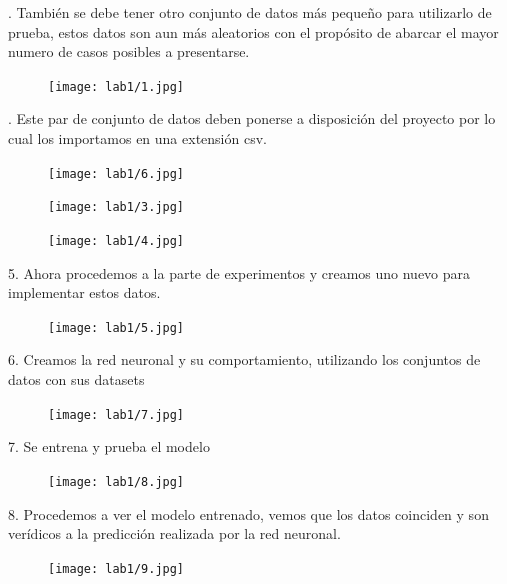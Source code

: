 \documentclass[11pt]{article}
\begin{document}
. También se debe tener otro conjunto de datos más pequeño para utilizarlo de prueba, estos datos son aun más aleatorios con el propósito de abarcar el mayor numero de casos posibles a presentarse.\\ 

\begin{figure}[htp]
\centering
\texttt{[image: lab1/1.jpg]}
\label{fig:lion}
\end{figure}

. Este par de conjunto de datos deben ponerse a disposición del proyecto por lo cual los importamos en una extensión csv.\\
\begin{figure}[htp]
\centering
\texttt{[image: lab1/6.jpg]}
\label{fig:lion}
\end{figure}

\begin{figure}[htp]
\centering
\texttt{[image: lab1/3.jpg]}
\label{fig:lion}
\end{figure}

\begin{figure}[htp]
\centering
\texttt{[image: lab1/4.jpg]}
\label{fig:lion}
\end{figure}

\newpage

5. Ahora procedemos a la parte de experimentos y creamos uno nuevo para implementar estos datos.
\begin{figure}[htp]
\centering
\texttt{[image: lab1/5.jpg]}
\label{fig:lion}
\end{figure}

\newpage


6. Creamos la red neuronal y su comportamiento, utilizando los conjuntos de datos con sus datasets
\begin{figure}[htp]
\centering
\texttt{[image: lab1/7.jpg]}
\label{fig:lion}
\end{figure}




7. Se entrena y prueba el modelo 

\begin{figure}[htp]
\centering
\texttt{[image: lab1/8.jpg]}
\label{fig:lion}
\end{figure}

\newpage



8. Procedemos a ver el modelo entrenado, vemos que los datos coinciden y son verídicos a la predicción realizada por la red neuronal.
\begin{figure}[htp]
\centering
\texttt{[image: lab1/9.jpg]}
\label{fig:lion}
\end{figure}
\end{document}
